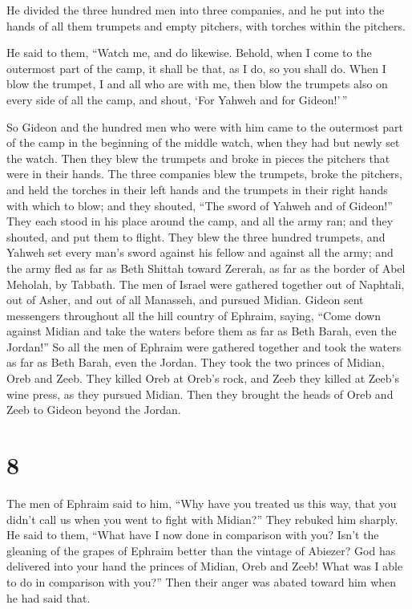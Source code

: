  He divided the three hundred men into three companies, and
he put into the hands of all them trumpets and empty pitchers, with
torches within the pitchers.

 He said to them, ``Watch me, and do likewise. Behold, when
I come to the outermost part of the camp, it shall be that, as I do, so
you shall do.  When I blow the trumpet, I and all who are
with me, then blow the trumpets also on every side of all the camp, and
shout, `For Yahweh and for Gideon!'\,''

 So Gideon and the hundred men who were with him came to
the outermost part of the camp in the beginning of the middle watch,
when they had but newly set the watch. Then they blew the trumpets and
broke in pieces the pitchers that were in their hands.  The
three companies blew the trumpets, broke the pitchers, and held the
torches in their left hands and the trumpets in their right hands with
which to blow; and they shouted, ``The sword of Yahweh and of Gideon!''
 They each stood in his place around the camp, and all the
army ran; and they shouted, and put them to flight.  They
blew the three hundred trumpets, and Yahweh set every man's sword
against his fellow and against all the army; and the army fled as far as
Beth Shittah toward Zererah, as far as the border of Abel Meholah, by
Tabbath.  The men of Israel were gathered together out of
Naphtali, out of Asher, and out of all Manasseh, and pursued Midian.
 Gideon sent messengers throughout all the hill country of
Ephraim, saying, ``Come down against Midian and take the waters before
them as far as Beth Barah, even the Jordan!'' So all the men of Ephraim
were gathered together and took the waters as far as Beth Barah, even
the Jordan.  They took the two princes of Midian, Oreb and
Zeeb. They killed Oreb at Oreb's rock, and Zeeb they killed at Zeeb's
wine press, as they pursued Midian. Then they brought the heads of Oreb
and Zeeb to Gideon beyond the Jordan.

\hypertarget{section-7}{%
\section{8}\label{section-7}}

 The men of Ephraim said to him, ``Why have you treated us
this way, that you didn't call us when you went to fight with Midian?''
They rebuked him sharply.  He said to them, ``What have I
now done in comparison with you? Isn't the gleaning of the grapes of
Ephraim better than the vintage of Abiezer?  God has
delivered into your hand the princes of Midian, Oreb and Zeeb! What was
I able to do in comparison with you?'' Then their anger was abated
toward him when he had said that.

